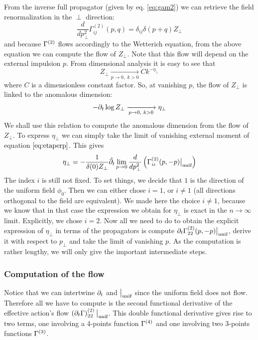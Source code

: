 From the inverse full propagator (given by eq. \eqref{eq:gam2}) we can retrieve the field renormalization in the $\perp$ direction:
\begin{equation}
\label{eq:etaperp}
\frac{d}{dp_\perp^2} \Gamma^{(2)}_{ij}(p,q) = \delta_{ij} \delta(p+q) Z_\perp
\end{equation}
and because $\Gamma^{(2)}$ flows accordingly to the Wetterich equation, from the above equation we can compute the flow of $Z_\perp$. 
Note that this flow will depend on the external impulsion $p$. From dimensional analysis it is easy to see that
\begin{equation}
 Z_\perp \xrightarrow[p \rightarrow 0,\text{~} k>0]{} C k^{-\eta_\perp}
 \end{equation} 
 where $C$ is a dimensionless constant factor. So, at vanishing $p$, the flow of $Z_\perp$ is linked to the anomalous dimension:
 \begin{equation}
 - \partial_{t} \log Z_\perp \xrightarrow[p \rightarrow 0,\text{~} k>0]{} \eta_\perp
 \end{equation}
 We shall use this relation to compute the anomalous dimension from the flow of $Z_\perp$.
 To express $\eta_\perp$ we can simply take the limit of vanishing external moment of equation $\eqref{eq:etaperp}$. This gives
\begin{equation}
\eta_\perp = -\frac{1}{\delta(0) Z_\perp} \hat{\partial_{t}} \lim_{p \rightarrow 0} \frac{d}{dp_\perp^2} \left( \Gamma^{(2)}_{ii}(p,-p)  \big|_{\text{unif}}  \right)
\end{equation}
The index $i$ is still not fixed. To set things, we decide that $1$ is the direction of the uniform field $\phi_0$. Then we can either chose $i=1$, or $i \neq 1$ (all directions orthogonal to the field are equivalent). We made here the choice $i \neq 1$, because we know that in that case the expression we obtain for $\eta_\perp$ is exact in the $n \rightarrow \infty$ limit. Explicitly, we chose $i=2$.
Now all we need to do to obtain the explicit expression of $\eta_\perp$ in terms of the propagators is compute $\partial_{t} \Gamma^{(2)}_{22}(p,-p)  \big|_{\text{unif}} $, derive it with respect to $p_\perp$ and take the limit of vanishing $p$. As the computation is rather lengthy, we will only give the important intermediate steps.

\subsubsection{Computation of the flow}
\label{sec:etaperp}
Notice that we can intertwine $\partial_{t}$ and $ \big|_{\text{unif}} $ since the uniform field does not flow. 
Therefore all we have to compute is the second functional derivative of the effective action's flow $ \left(\partial_{t} \Gamma\right)^{(2)}_{22}  \big|_{\text{unif}} $. This double functional derivative gives rise to two terms, one involving a 4-points function $\Gamma^{(4)}$ and one involving two 3-points functions $\Gamma^{(3)}$.


